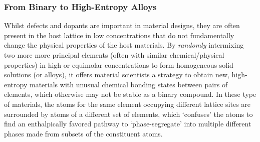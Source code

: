 \subsubsection{From Binary to High-Entropy Alloys}\label{sect:HEA}
Whilst defects and dopants are important in material designs, they are often present in the host lattice in low concentrations that do not fundamentally change the physical properties of the host materials. By \emph{randomly} intermixing two more more principal elements (often with similar chemical/physical properties) in high or equimolar concentrations to form homogeneous solid solutions (or alloys), it offers material scientists a  strategy to obtain new, high-entropy materials\cite{george2019high,oses2020high} with unusual chemical bonding states between pairs of elements, which otherwise may not be  stable as a binary compound. In these type of materials, the atoms for the same element occupying different lattice sites are surrounded by atoms of a different set of elements, which `confuses' the atoms to find an enthalpically favored pathway to `phase-segregate' into multiple different phases made from subsets of the constituent atoms. 

